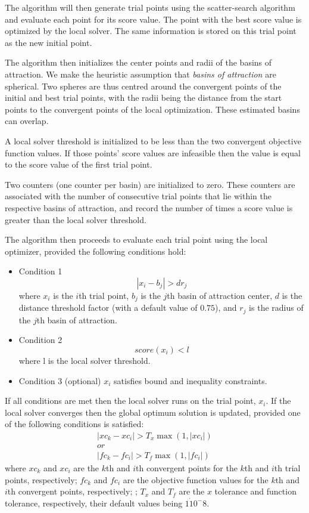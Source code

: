The algorithm will then generate trial points using the scatter-search algorithm and evaluate each point for its score value. The point with the best score value is optimized by the local solver. The same information is stored on this trial point as the new initial point. 

The algorithm then initializes the center points and radii of the basins of attraction. We make the heuristic assumption that \textit{basins of attraction} are spherical. Two spheres are thus centred around the convergent points of the initial and best trial points, with the radii being the distance from the start points to the convergent points of the local optimization. These estimated basins can overlap. 

A local solver threshold is initialized to be less than the two convergent objective function values. If those points' score values are infeasible then the value is equal to the score value of the first trial point. 

Two counters (one counter per basin) are initialized to zero. These counters are associated with the number of consecutive trial points that lie within the respective basins of attraction, and record the number of times a score value is greater than the local solver threshold. 

The algorithm then proceeds to evaluate each trial point using the local optimizer, provided the following conditions hold:


\begin{itemize}
\item Condition 1
    \begin{equation}
        \label{eq:condition1}
        | x_i - b_j | > dr_j
    \end{equation}
        where $x_i$ is the $i$th trial point, $b_j$ is the $j$th basin of attraction center, $d$ is the distance threshold factor (with a default value of $0.75$), and $r_j$ is the radius of the $j$th basin of attraction. 
    \item Condition 2 \[ score(x_i) < l\] where l is the local solver threshold.
    \item Condition 3 (optional) $x_i$ satisfies bound and inequality constraints.
\end{itemize}
If all conditions are met then the local solver runs on the trial point, $x_i$. If the local solver converges then the global optimum solution is updated, provided one of the following conditions is satisfied:
\begin{align}
    \label{eq:updateglobal}
    |xc_k - xc_i | > T_x \max ( 1,|xc_i| ) \nonumber \\ 
    or \\
    |fc_k - fc_i | > T_f \max ( 1,|fc_i| )  \nonumber
\end{align}
where $xc_k$ and $xc_i$ are the $k$th and $i$th convergent points for the $k$th and $i$th trial points, respectively; $fc_k$ and $fc_i$ are the objective function values for the $k$th and $i$th convergent points, respectively; ; $T_x$ and $T_f$ are the $x$ tolerance and function tolerance, respectively, their default values being $1\dot 10^-8$. 

